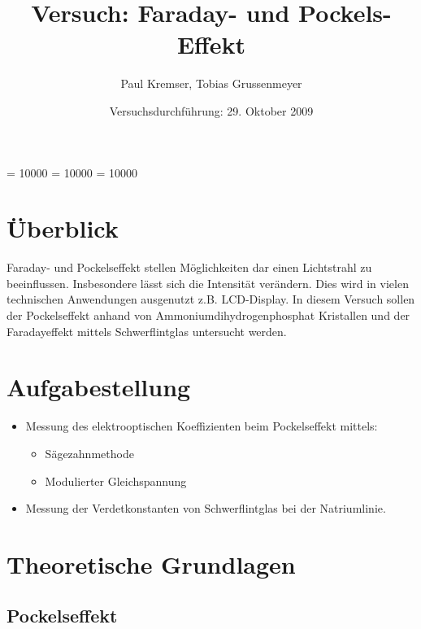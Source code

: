 \documentclass[12pt]{article}
\newcommand{\changefont}[3]{
\fontfamily{#1} \fontseries{#2} \fontshape{#3} \selectfont}
\begin{document}
\clubpenalty = 10000
\widowpenalty = 10000 
\displaywidowpenalty = 10000

\onehalfspacing
\changefont{ptm}{m}{n} 

\begin{titlepage}
\author{Paul Kremser, Tobias Grussenmeyer}
\title{Versuch: Faraday- und Pockels-Effekt}
\date{Versuchsdurchführung: 29. Oktober 2009} 
\maketitle
\thispagestyle{empty}
\end{titlepage}


\tableofcontents
\thispagestyle{empty}
\newpage
{}
\section{Überblick}
Faraday- und Pockelseffekt stellen Möglichkeiten dar einen Lichtstrahl zu beeinflussen. Insbesondere lässt sich die Intensität verändern. Dies wird in vielen technischen Anwendungen ausgenutzt z.B. LCD-Display. In diesem Versuch sollen der Pockelseffekt anhand von Ammoniumdihydrogenphosphat Kristallen und der Faradayeffekt mittels Schwerflintglas untersucht werden.

\section{Aufgabestellung}
\begin{itemize}


 \item Messung des elektrooptischen Koeffizienten beim Pockelseffekt mittels:
\begin{itemize}
 \item Sägezahnmethode
 \item Modulierter Gleichspannung
\end{itemize}

 \item Messung der Verdetkonstanten von Schwerflintglas bei der Natriumlinie.
 
\end{itemize}
\section{Theoretische Grundlagen}

\subsection{Pockelseffekt}
\end{document}
